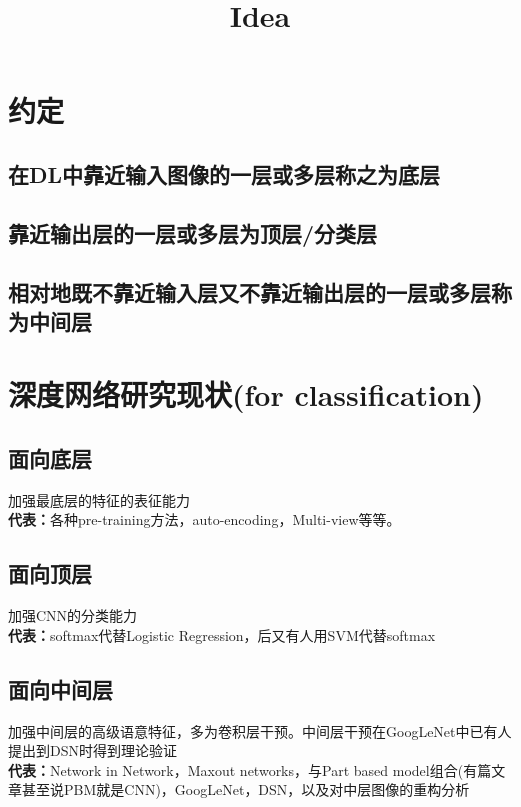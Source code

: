 \documentclass{article}
\begin{document}
\begin{CJK}{UTF8}{gbsn}
\title{Idea}

{
\color{blue}
\section*{约定}
\subsection{在DL中靠近输入图像的一层或多层称之为底层}
\subsection{靠近输出层的一层或多层为顶层/分类层}
\subsection{相对地既不靠近输入层又不靠近输出层的一层或多层称为中间层}
}

\section{深度网络研究现状(for classification)}
\subsection{面向底层}
加强最底层的特征的表征能力\\
\textbf{代表：}各种pre-training方法，auto-encoding，Multi-view\cite{sermanet2013overfeat}等等。
\subsection{面向顶层}
加强CNN的分类能力\\
\textbf{代表：}softmax代替Logistic Regression\cite{karpathy2014large}，后又有人用SVM代替softmax\cite{tang2013deep}\cite{nagi2012convolutional}
\subsection{面向中间层}
加强中间层的高级语意特征，多为卷积层干预。中间层干预在GoogLeNet中已有人提出到DSN时得到理论验证\\
\textbf{代表：}Network in Network\cite{NIN}，Maxout networks\cite{goodfellow2013maxout}，与Part based model组合\cite{ouyang2013joint}(有篇文章甚至说PBM就是CNN\cite{zeiler2011adaptive})，GoogLeNet\cite{szegedy2014going}，DSN\cite{lee2014deeply}，以及对中层图像的重构分析\cite{zeiler2014visualizing}

\end{CJK}
\end{document}
